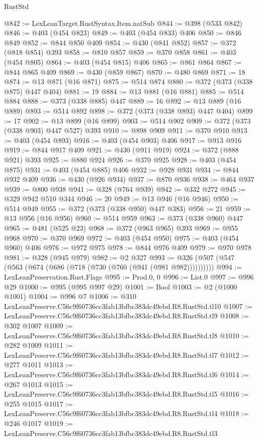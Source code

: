 \begin{lexlean}{RustStd}
\begin{coremodule}
@842 := LexLeanTarget.RustSyntax.Item.natSub
@844 := @398 (@533 @842)
@846 := @403 (@454 @823)
@849 := @403 (@454 @833) @406
@850 := @846 @849
@852 := @844 @850 @409
@854 := @430 (@841 @852)
@857 := @372 (@818 @854) @393
@858 := @810 @857
@859 := @370 @858
@861 := @403 (@454 @805)
@864 := @403 (@454 @815) @406
@865 := @861 @864
@867 := @844 @865 @409
@869 := @430 (@859 @867)
@870 := @480 @869
@871 := 18
@874 := @13 @871 (@16 @871)
@875 := @514 @874
@880 := @372 (@373 (@338 @875) @447 @404)
@881 := 19
@884 := @13 @881 (@16 @881)
@885 := @514 @884
@888 := @373 (@338 @885) @447
@889 := 16
@892 := @13 @889 (@16 @889)
@893 := @514 @892
@898 := @372 (@373 (@338 @893) @447 @404)
@899 := 17
@902 := @13 @899 (@16 @899)
@903 := @514 @902
@909 := @372 (@373 (@338 @903) @447 @527) @393
@910 := @898 @909
@911 := @370 @910
@913 := @403 (@454 @893)
@916 := @403 (@454 @903) @406
@917 := @913 @916
@919 := @844 @917 @409
@921 := @430 (@911 @919)
@924 := @372 (@888 @921) @393
@925 := @880 @924
@926 := @370 @925
@928 := @403 (@454 @875)
@931 := @403 (@454 @885) @406
@932 := @928 @931
@934 := @844 @932 @409
@936 := @430 (@926 @934)
@937 := @870 @936
@938 := @464 @937
@939 := @800 @938
@941 := @328 (@764 @939)
@942 := @332 @272
@945 := @329 @942 @510 @344
@946 := 20
@949 := @13 @946 (@16 @946)
@950 := @514 @949
@955 := @372 (@373 (@338 @950) @447 @383)
@956 := 21
@959 := @13 @956 (@16 @956)
@960 := @514 @959
@963 := @373 (@338 @960) @447
@965 := @481 (@525 @23)
@968 := @372 (@963 @965) @393
@969 := @955 @968
@970 := @370 @969
@972 := @403 (@454 @950)
@975 := @403 (@454 @960) @406
@976 := @972 @975
@978 := @844 @976 @409
@979 := @970 @978
@981 := @328 (@945 @979)
@982 := @2 @327
@993 := @326 (@507 (@547 (@563 (@674 (@686 (@718 (@730 (@760 (@941 (@981 @982))))))))))
@994 := LexLeanPreservation.Rust.Flags
@995 := Prod.{0, 0}
@996 := List.{0}
@997 := @996 @29
@1000 := @995 (@995 @997 @29)
@1001 := Bool
@1003 := @2 (@1000 @1001)
@1004 := @996 @7
@1006 := @310 LexLeanPreserve.C56c9f60736cc3fab13bfbc383dc49ebd.R8.RustStd.tl10
@1007 := LexLeanPreserve.C56c9f60736cc3fab13bfbc383dc49ebd.R8.RustStd.tl9
@1008 := @302 @1007
@1009 := LexLeanPreserve.C56c9f60736cc3fab13bfbc383dc49ebd.R8.RustStd.tl8
@1010 := @282 @1009
@1011 := LexLeanPreserve.C56c9f60736cc3fab13bfbc383dc49ebd.R8.RustStd.tl7
@1012 := @277 @1011
@1013 := LexLeanPreserve.C56c9f60736cc3fab13bfbc383dc49ebd.R8.RustStd.tl6
@1014 := @267 @1013
@1015 := LexLeanPreserve.C56c9f60736cc3fab13bfbc383dc49ebd.R8.RustStd.tl5
@1016 := @255 @1015
@1017 := LexLeanPreserve.C56c9f60736cc3fab13bfbc383dc49ebd.R8.RustStd.tl4
@1018 := @246 @1017
@1019 := LexLeanPreserve.C56c9f60736cc3fab13bfbc383dc49ebd.R8.RustStd.tl3

\end{coremodule}
\end{lexlean}
